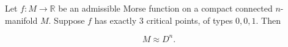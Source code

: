 Let $f: M \to \mathbb{R}$ be an admissible Morse function on a compact connected $n$-manifold $M$. Suppose $f$ has exactly 3 critical points, of types $0, 0, 1$. Then

$$M \approx D^n.$$
